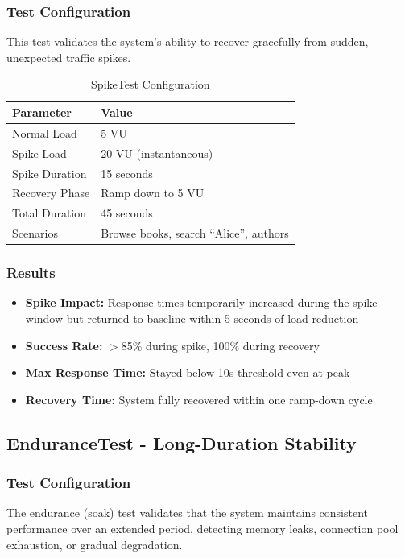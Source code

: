 \subsubsection{Test Configuration}
This test validates the system's ability to recover gracefully from sudden, unexpected traffic spikes.

\begin{table}[H]
    \centering
    \caption{SpikeTest Configuration}
    \label{tab:spike_config}
    \begin{tabular}{@{}ll@{}}
        \toprule
        \textbf{Parameter} & \textbf{Value} \\ \midrule
        Normal Load & 5 VU \\
        Spike Load & 20 VU (instantaneous) \\
        Spike Duration & 15 seconds \\
        Recovery Phase & Ramp down to 5 VU \\
        Total Duration & 45 seconds \\
        Scenarios & Browse books, search ``Alice'', authors \\
        \bottomrule
    \end{tabular}
\end{table}

\subsubsection{Results}
\begin{itemize}
    \item \textbf{Spike Impact:} Response times temporarily increased during the spike window but returned to baseline within 5 seconds of load reduction
    \item \textbf{Success Rate:} $>$85\% during spike, 100\% during recovery
    \item \textbf{Max Response Time:} Stayed below 10s threshold even at peak
    \item \textbf{Recovery Time:} System fully recovered within one ramp-down cycle
\end{itemize}

\subsection{EnduranceTest - Long-Duration Stability}

\subsubsection{Test Configuration}
The endurance (soak) test validates that the system maintains consistent performance over an extended period, detecting memory leaks, connection pool exhaustion, or gradual degradation.

